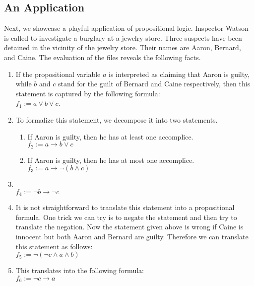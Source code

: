 \subsection{An Application}
Next, we showcase a playful application of propositional logic.  Inspector Watson is called to investigate a
burglary at a jewelry store.  Three suspects have been detained in the vicinity of the jewelry store.
Their names are Aaron, Bernard, and Caine.  The evaluation of the files reveals the following facts.
\begin{enumerate}
\item {}

      If the propositional variable $a$ is interpreted as claiming that Aaron is guilty, while $b$ and $c$
      stand for the guilt of Bernard and Caine respectively, then this statement is captured by the following formula: 
      \\[0.2cm]
      \hspace*{1.3cm} 
      $f_1 := a \vee b \vee c$.
\item {}
      
      To formalize this statement, we decompose it into two statements.
      \begin{enumerate}
      \item If Aaron is guilty, then he has at least one accomplice. \\[0.2cm]
            \hspace*{1.3cm} $f_2 := a \rightarrow b \vee c$ 
      \item If Aaron is guilty, then he has at most one accomplice. \\[0.2cm]
           \hspace*{1.3cm} $f_3 := a \rightarrow \neg (b \wedge c)$
      \end{enumerate}
\item {} \\[0.2cm]
      \hspace*{1.3cm} $f_4 :=  \neg b \rightarrow \neg c$ 
\item {}

      It is not straightforward to translate this statement into a propositional formula.
      One trick we can try is to negate the statement and then try to translate the negation.
      Now the statement given above is wrong if Caine is innocent but both Aaron and Bernard are guilty.
      Therefore we can translate this statement as follows: \\[0.2cm]
      \hspace*{1.3cm} $f_5 := \neg ( \neg c  \wedge a \wedge b )$ 
\item {} 

      This translates into the following formula:\\[0.2cm]
      \hspace*{1.3cm} $f_6 := \neg c \rightarrow a$
\end{enumerate}
